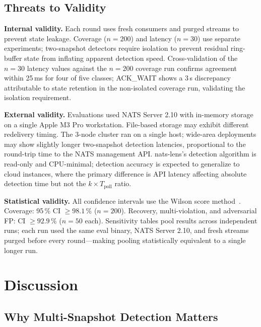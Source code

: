 \documentclass[journal]{IEEEtran}
\begin{document}
\subsection{Threats to Validity}

\textbf{Internal validity.} Each round uses fresh consumers and purged streams
to prevent state leakage. Coverage ($n{=}200$) and latency ($n{=}30$) use
separate experiments; two-snapshot detectors require isolation to prevent
residual ring-buffer state from inflating apparent detection speed.
Cross-validation of the $n{=}30$ latency values against the $n{=}200$
coverage run confirms agreement within 25\,ms for four of five classes;
ACK\_WAIT shows a 3\,s discrepancy attributable to state retention in the
non-isolated coverage run, validating the isolation requirement.

\textbf{External validity.} Evaluations used NATS Server 2.10 with
in-memory storage on a single Apple M3 Pro workstation.
File-based storage may exhibit different redelivery timing.
The 3-node cluster ran on a single host; wide-area deployments may show
slightly longer two-snapshot detection latencies, proportional to the
round-trip time to the NATS management API.
nats-lens's detection algorithm is read-only and CPU-minimal; detection
accuracy is expected to generalize to cloud instances, where the primary
difference is API latency affecting absolute detection time but not the
$k \times T_\text{poll}$ ratio.

\textbf{Statistical validity.} All confidence intervals use the Wilson
score method~\cite{wilson1927}. Coverage: 95\,\% CI $\geq 98.1\,\%$
($n{=}200$). Recovery, multi-violation, and adversarial FP:
CI $\geq 92.9\,\%$ ($n{=}50$ each).
Sensitivity tables pool results across independent runs; each run used
the same eval binary, NATS Server 2.10, and fresh streams purged before
every round---making pooling statistically equivalent to a single
longer run.

\section{Discussion}
\label{sec:discussion}

\subsection{Why Multi-Snapshot Detection Matters}
\end{document}
